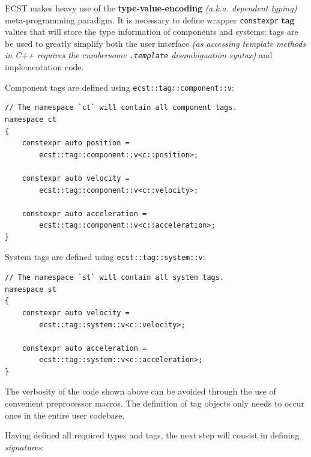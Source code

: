 \documentclass[twoside, 12pt, a4paper, openright]{book}
\begin{document}
ECST makes heavy use of the \textbf{type-value-encoding} \emph{(a.k.a.
dependent typing)} meta-programming paradigm. It is necessary to define
wrapper
\texttt{constexpr}
\textbf{tag} values that will store the type information of components
and systems: tags are be used to greatly simplify both the user
interface \emph{(as accessing template methods in C++ requires the
cumbersome
\texttt{.template}
disambiguation syntax)} and implementation code.

Component tags are defined using
\texttt{ecst::tag::component::v}:

\begin{verbatim}
// The namespace `ct` will contain all component tags.
namespace ct
{
    constexpr auto position =
        ecst::tag::component::v<c::position>;

    constexpr auto velocity =
        ecst::tag::component::v<c::velocity>;

    constexpr auto acceleration =
        ecst::tag::component::v<c::acceleration>;
}
\end{verbatim}

System tags are defined using
\texttt{ecst::tag::system::v}:

\begin{verbatim}
// The namespace `st` will contain all system tags.
namespace st
{
    constexpr auto velocity =
        ecst::tag::system::v<c::velocity>;

    constexpr auto acceleration =
        ecst::tag::system::v<c::acceleration>;
}
\end{verbatim}

The verbosity of the code shown above can be avoided through the use of
convenient preprocessor macros. The definition of tag objects only needs
to occur once in the entire user codebase.

Having defined all required types and tags, the next step will consist
in defining \emph{signatures}:
\end{document}
